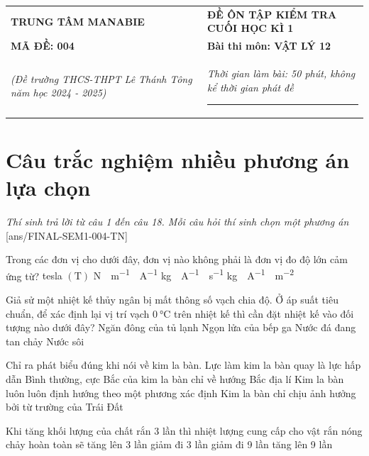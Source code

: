 \begin{tabular}{M{7cm}M{10.5cm}}
	\textbf{TRUNG TÂM MANABIE}& \textbf{ĐỀ ÔN TẬP KIỂM TRA CUỐI HỌC KÌ 1}\\
	\textbf{MÃ ĐỀ: 004}& \textbf{Bài thi môn: VẬT LÝ 12}\\
	\textit{(Đề trường THCS-THPT Lê Thánh Tông năm học 2024 - 2025)}& \textit{Thời gian làm bài: 50 phút, không kể thời gian phát đề}
	
	\noindent\rule{4cm}{0.8pt} \\
\end{tabular}
\setcounter{section}{0}
\section{Câu trắc nghiệm nhiều phương án lựa chọn}
\textit{Thí sinh trả lời từ câu 1 đến câu 18. Mỗi câu hỏi thí sinh chọn một phương án}
\setcounter{ex}{0}
[ans/FINAL-SEM1-004-TN]
\begin{ex}
	Trong các đơn vị cho dưới đây, đơn vị nào không phải là đơn vị đo độ lớn cảm ứng từ?
	\choice
	{tesla $\left(\si{\tesla}\right)$}
	{\si{\newton\cdot\meter^{-1}\cdot\ampere^{-1}}}
	{\si{\kilogram\cdot\ampere^{-1}\cdot\second^{-1}}}
	{\True \si{\kilogram\cdot\ampere^{-1}\cdot\meter^{-2}}}
	\loigiai{}
\end{ex}
\begin{ex}
	Giả sử một nhiệt kế thủy ngân bị mất thông số vạch chia độ. Ở áp suất tiêu chuẩn, để xác định lại vị trí vạch $\SI{0}{\celsius}$ trên nhiệt kế thì cần đặt nhiệt kế vào đối tượng nào dưới đây?
	\choice
	{Ngăn đông của tủ lạnh}
	{Ngọn lửa của bếp ga}
	{\True Nước đá đang tan chảy}
	{Nước sôi}
	\loigiai{}
\end{ex}
\begin{ex}
	Chỉ ra phát biểu đúng khi nói về kim la bàn.
	\choice
	{Lực làm kim la bàn quay là lực hấp dẫn}
	{\True Bình thường, cực Bắc của kim la bàn chỉ về hướng Bắc địa lí}
	{Kim la bàn luôn luôn định hướng theo một phương xác định}
	{Kim la bàn chỉ chịu ảnh hưởng bởi từ trường của Trái Đất}
	\loigiai{}
\end{ex}
\begin{ex}
	Khi tăng khối lượng của chất rắn 3 lần thì nhiệt lượng cung cấp cho vật rắn nóng chảy hoàn toàn sẽ
	\choice
	{\True tăng lên 3 lần}
	{giảm đi 3 lần}
	{giảm đi 9 lần}
	{tăng lên 9 lần}
	\loigiai{}
\end{ex}

